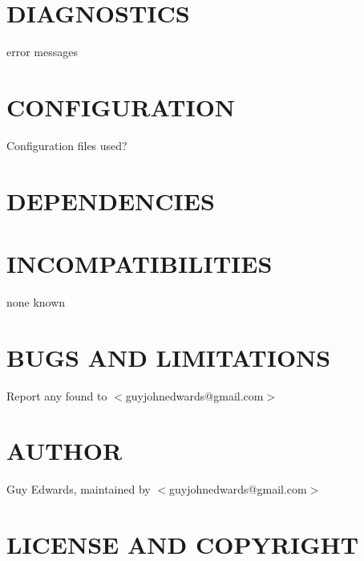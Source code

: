 \documentclass{book}
\begin{document}
\section{DIAGNOSTICS}
\label{_DIAGNOSTICS}
\hypertarget{_DIAGNOSTICS}{}



error messages


\section{CONFIGURATION}
\label{_CONFIGURATION}
\hypertarget{_CONFIGURATION}{}



Configuration files used?


\section{DEPENDENCIES}
\label{_DEPENDENCIES}
\hypertarget{_DEPENDENCIES}{}


\section{INCOMPATIBILITIES}
\label{_INCOMPATIBILITIES}
\hypertarget{_INCOMPATIBILITIES}{}



none known


\section{BUGS AND LIMITATIONS}
\label{_BUGS_AND_LIMITATIONS}
\hypertarget{_BUGS_AND_LIMITATIONS}{}



Report any found to $<$guyjohnedwards@gmail.com$>$


\section{AUTHOR}
\label{_AUTHOR}
\hypertarget{_AUTHOR}{}



Guy Edwards, maintained by $<$guyjohnedwards@gmail.com$>$


\section{LICENSE AND COPYRIGHT}
\label{_LICENSE_AND_COPYRIGHT}
\hypertarget{_LICENSE_AND_COPYRIGHT}{}
\end{document}
